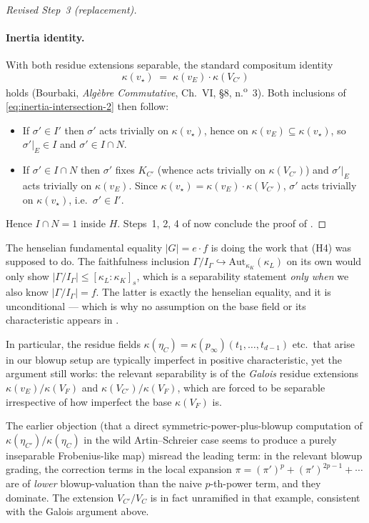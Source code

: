 \documentclass[11pt]{article}
\begin{document}
\begin{proof}[Revised Step~3 (replacement)]
\paragraph{Inertia identity.}
With both residue extensions separable, the standard compositum identity
\[
\kappa(v_\star) \;=\; \kappa(v_E) \cdot \kappa(V_{C'})
\]
holds (Bourbaki, \emph{Algèbre Commutative}, Ch.~VI, \S8, n.\textsuperscript{o}~3).
Both inclusions of \eqref{eq:inertia-intersection-2} then follow:
\begin{itemize}
\item If $\sigma' \in I'$ then $\sigma'$ acts trivially on $\kappa(v_\star)$,
      hence on $\kappa(v_E) \subseteq \kappa(v_\star)$, so $\sigma'|_E \in I$
      and $\sigma' \in I \cap N$.
\item If $\sigma' \in I \cap N$ then $\sigma'$ fixes $K_{C'}$ (whence acts
      trivially on $\kappa(V_{C'})$) and $\sigma'|_E$ acts trivially on
      $\kappa(v_E)$.  Since $\kappa(v_\star) = \kappa(v_E)\cdot\kappa(V_{C'})$,
      $\sigma'$ acts trivially on $\kappa(v_\star)$, i.e.\ $\sigma' \in I'$.
\end{itemize}
Hence $I \cap N = 1$ inside $H$.  Steps~1, 2, 4 of
 now conclude the proof of
.
\end{proof}

\begin{rem*}\label{rem:why-h4-was-unnecessary}
The henselian fundamental equality $|G| = e \cdot f$ is doing the work that
(H4) was supposed to do.  The faithfulness inclusion
$\Gamma/I_\Gamma \hookrightarrow \mathrm{Aut}_{\kappa_K}(\kappa_L)$ on its
own would only show $|\Gamma/I_\Gamma| \leq [\kappa_L:\kappa_K]_s$, which is
a separability statement \emph{only when} we also know
$|\Gamma/I_\Gamma| = f$.  The latter is exactly the henselian equality, and
it is unconditional --- which is why no assumption on the base field or its
characteristic appears in .

In particular, the residue fields $\kappa(\eta_C) = \kappa(p_\infty)(t_1,
\dots, t_{d-1})$ etc.\ that arise in our blowup setup are typically
imperfect in positive characteristic, yet the argument still works: the
relevant separability is of the \emph{Galois} residue extensions $\kappa(v_E)
/\kappa(V_F)$ and $\kappa(V_{C'})/\kappa(V_F)$, which are forced to be
separable irrespective of how imperfect the base $\kappa(V_F)$ is.

The earlier objection (that a direct symmetric-power-plus-blowup computation
of $\kappa(\eta_{C'})/\kappa(\eta_C)$ in the wild Artin--Schreier case seems
to produce a purely inseparable Frobenius-like map) misread the leading
term: in the relevant blowup grading, the correction terms in the local
expansion $\pi = (\pi')^p + (\pi')^{2p-1} + \cdots$ are of \emph{lower}
blowup-valuation than the naive $p$-th-power term, and they dominate.  The
extension $V_{C'}/V_C$ is in fact unramified in that example, consistent
with the Galois argument above.
\end{rem*}


\printbibliography
\end{document}
